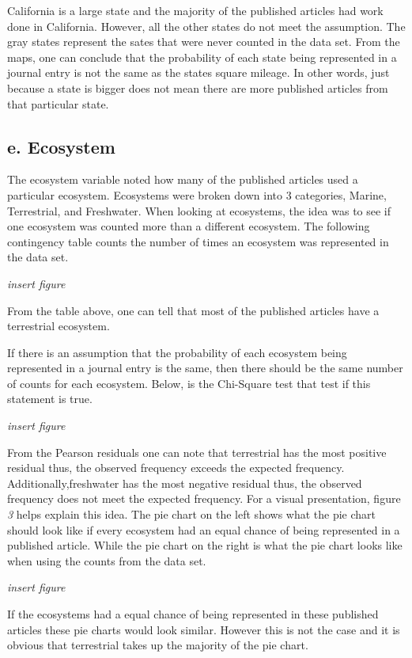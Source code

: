\documentclass[
]{article}
\begin{document}
California is a large state and the majority of the published articles
had work done in California. However, all the other states do not meet
the assumption. The gray states represent the sates that were never
counted in the data set. From the maps, one can conclude that the
probability of each state being represented in a journal entry is not
the same as the states square mileage. In other words, just because a
state is bigger does not mean there are more published articles from
that particular state.

\hypertarget{e.-ecosystem}{%
\subsection{e. Ecosystem}\label{e.-ecosystem}}

The ecosystem variable noted how many of the published articles used a
particular ecosystem. Ecosystems were broken down into 3 categories,
Marine, Terrestrial, and Freshwater. When looking at ecosystems, the
idea was to see if one ecosystem was counted more than a different
ecosystem. The following contingency table counts the number of times an
ecosystem was represented in the data set.

\emph{insert figure}

From the table above, one can tell that most of the published articles
have a terrestrial ecosystem.

If there is an assumption that the probability of each ecosystem being
represented in a journal entry is the same, then there should be the
same number of counts for each ecosystem. Below, is the Chi-Square test
that test if this statement is true.

\emph{insert figure}

From the Pearson residuals one can note that terrestrial has the most
positive residual thus, the observed frequency exceeds the expected
frequency. Additionally,freshwater has the most negative residual thus,
the observed frequency does not meet the expected frequency. For a
visual presentation, figure \emph{3} helps explain this idea. The pie
chart on the left shows what the pie chart should look like if every
ecosystem had an equal chance of being represented in a published
article. While the pie chart on the right is what the pie chart looks
like when using the counts from the data set.

\emph{insert figure}

If the ecosystems had a equal chance of being represented in these
published articles these pie charts would look similar. However this is
not the case and it is obvious that terrestrial takes up the majority of
the pie chart.
\end{document}

